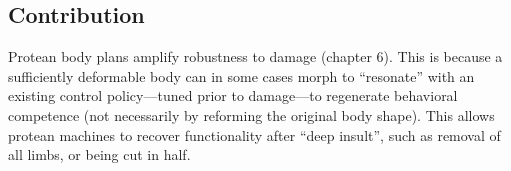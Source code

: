 \subsection{Contribution}

Protean body plans amplify robustness to damage (chapter 6).
This is because a sufficiently deformable body can in some cases morph to ``resonate'' with an existing control policy---tuned prior to damage---to regenerate behavioral competence (not necessarily by reforming the original body shape).
This allows protean machines to recover functionality after ``deep insult'', such as removal of all limbs, or being cut in half.









